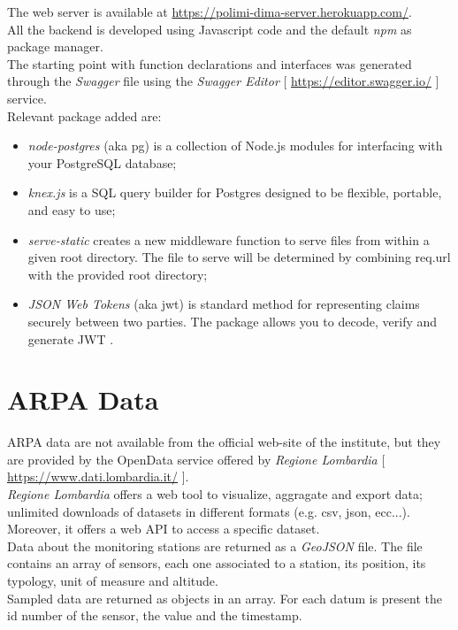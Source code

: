 The web server is available at \url{https://polimi-dima-server.herokuapp.com/}.\\

All the backend is developed using Javascript code and the default \textit{npm} as package manager.\\

The starting point with function declarations and interfaces was generated through the \textit{Swagger} file using the \textit{Swagger Editor} [ \url{https://editor.swagger.io/} ] service.\\

Relevant package added are:
\begin{itemize}
    \item \textit{node-postgres} (aka pg) is a collection of Node.js modules for interfacing with your PostgreSQL database;
    \item \textit{knex.js} is a SQL query builder for Postgres designed to be flexible, portable, and easy to use;
    \item \textit{serve-static} creates a new middleware function to serve files from within a given root directory. The file to serve will be determined by combining req.url with the provided root directory;
    \item \textit{JSON Web Tokens} (aka jwt) is standard method for representing claims securely between two parties. The package allows you to decode, verify and generate JWT .
\end{itemize}

\clearpage
\section{ARPA Data}
ARPA data are not available from the official web-site of the institute, but they are provided by the OpenData service offered by \textit{Regione Lombardia} [ \url{https://www.dati.lombardia.it/} ].\\

\textit{Regione Lombardia} offers a web tool to visualize, aggragate and export data; unlimited downloads of datasets in different formats (e.g. csv, json, ecc...).
Moreover, it offers a web API to access a specific dataset.\\

Data about the monitoring stations are returned as a \textit{GeoJSON} file. The file contains an array of sensors, each one associated to a station, its position, its typology, unit of measure and altitude.\\

Sampled data are returned as objects in an array. For each datum is present the id number of the sensor, the value and the timestamp.
